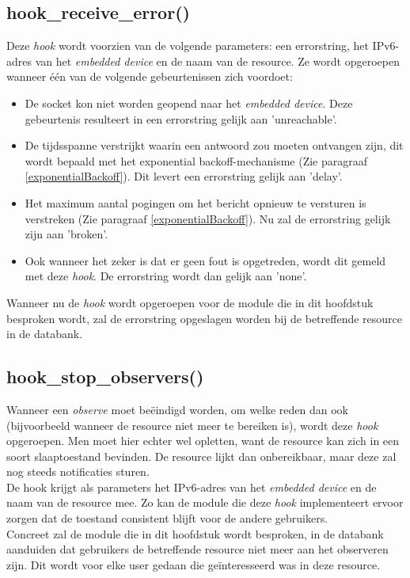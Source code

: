 \subsection{hook\_receive\_error()}
Deze \textit{hook} wordt voorzien van de volgende parameters: een errorstring, het IPv6-adres van het \textit{embedded device} en de naam van de resource. Ze wordt opgeroepen wanneer \'{e}\'{e}n van de volgende gebeurtenissen zich voordoet:
\begin{itemize}
\item De socket kon niet worden geopend naar het \textit{embedded device}. Deze gebeurtenis resulteert in een errorstring gelijk aan 'unreachable'.
\item De tijdsspanne verstrijkt waarin een antwoord zou moeten ontvangen zijn, dit wordt bepaald met het exponential backoff-mechanisme (Zie paragraaf \ref{exponentialBackoff}). Dit levert een errorstring gelijk aan 'delay'.
\item Het maximum aantal pogingen om het bericht opnieuw te versturen is verstreken (Zie paragraaf \ref{exponentialBackoff}). Nu zal de errorstring gelijk zijn aan 'broken'.
\item Ook wanneer het zeker is dat er geen fout is opgetreden, wordt dit gemeld met deze \textit{hook}. De errorstring wordt dan gelijk aan 'none'.
\end{itemize}
Wanneer nu de \textit{hook} wordt opgeroepen voor de module die in dit hoofdstuk besproken wordt, zal de errorstring opgeslagen worden bij de betreffende resource in de databank.

\subsection{hook\_stop\_observers()}
Wanneer een \textit{observe} moet be\"{e}indigd worden, om welke reden dan ook (bijvoorbeeld wanneer de resource niet meer te bereiken is), wordt deze \textit{hook} opgeroepen. Men moet hier echter wel opletten, want de resource kan zich in een soort slaaptoestand bevinden. De resource lijkt dan onbereikbaar, maar deze zal nog steeds notificaties sturen.\\
De hook krijgt als parameters het IPv6-adres van het \textit{embedded device} en de naam van de resource mee. Zo kan de module die deze \textit{hook} implementeert ervoor zorgen dat de toestand consistent blijft voor de andere gebruikers.\\
Concreet zal de module die in dit hoofdstuk wordt besproken, in de databank aanduiden dat gebruikers de betreffende resource niet meer aan het observeren zijn. Dit wordt voor elke user gedaan die ge\"{i}nteresseerd was in deze resource.